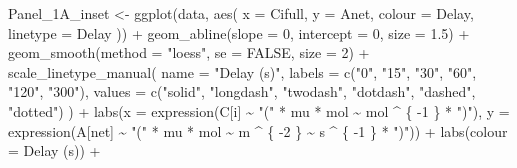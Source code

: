 \documentclass[
]{krantz}
\makeatletter
\newenvironment{Shaded}{\begin{snugshade}}{\end{snugshade}}
\newcommand{\AttributeTok}[1]{\textcolor[rgb]{0.77,0.63,0.00}{#1}}
\newcommand{\ConstantTok}[1]{\textcolor[rgb]{0.00,0.00,0.00}{#1}}
\newcommand{\DecValTok}[1]{\textcolor[rgb]{0.00,0.00,0.81}{#1}}
\newcommand{\FloatTok}[1]{\textcolor[rgb]{0.00,0.00,0.81}{#1}}
\newcommand{\FunctionTok}[1]{\textcolor[rgb]{0.00,0.00,0.00}{#1}}
\newcommand{\NormalTok}[1]{#1}
\newcommand{\OtherTok}[1]{\textcolor[rgb]{0.56,0.35,0.01}{#1}}
\newcommand{\SpecialCharTok}[1]{\textcolor[rgb]{0.00,0.00,0.00}{#1}}
\newcommand{\StringTok}[1]{\textcolor[rgb]{0.31,0.60,0.02}{#1}}
\newenvironment{kframe}{%
\medskip{}
\setlength{\fboxsep}{.8em}
 \def\at@end@of@kframe{}%
 \ifinner\ifhmode%
  \def\at@end@of@kframe{\end{minipage}}%
  \begin{minipage}{\columnwidth}%
 \fi\fi%
 \def\FrameCommand##1{\hskip\@totalleftmargin \hskip-\fboxsep
 \colorbox{shadecolor}{##1}\hskip-\fboxsep
     \hskip-\linewidth \hskip-\@totalleftmargin \hskip\columnwidth}%
 \MakeFramed {\advance\hsize-\width
   \@totalleftmargin\z@ \linewidth\hsize
   \@setminipage}}%
 {\par\unskip\endMakeFramed%
 \at@end@of@kframe}
\renewenvironment{Shaded}{\begin{kframe}}{\end{kframe}}
\makeatother
\begin{document}
\begin{Shaded}
\begin{Highlighting}[]
\NormalTok{Panel\_1A\_inset }\OtherTok{\textless{}{-}}
  \FunctionTok{ggplot}\NormalTok{(data, }\FunctionTok{aes}\NormalTok{(}
    \AttributeTok{x =}\NormalTok{ Cifull,}
    \AttributeTok{y =}\NormalTok{ Anet,}
    \AttributeTok{colour =}\NormalTok{ Delay,}
    \AttributeTok{linetype =}\NormalTok{ Delay}
\NormalTok{  )) }\SpecialCharTok{+}
  \FunctionTok{geom\_abline}\NormalTok{(}\AttributeTok{slope =} \DecValTok{0}\NormalTok{,}
              \AttributeTok{intercept =} \DecValTok{0}\NormalTok{,}
              \AttributeTok{size =} \FloatTok{1.5}\NormalTok{) }\SpecialCharTok{+}
  \FunctionTok{geom\_smooth}\NormalTok{(}\AttributeTok{method =} \StringTok{"loess"}\NormalTok{, }\AttributeTok{se =} \ConstantTok{FALSE}\NormalTok{, }\AttributeTok{size =} \DecValTok{2}\NormalTok{) }\SpecialCharTok{+}
  \FunctionTok{scale\_linetype\_manual}\NormalTok{(}
    \AttributeTok{name =} \StringTok{"Delay (s)"}\NormalTok{,}
    \AttributeTok{labels =} \FunctionTok{c}\NormalTok{(}\StringTok{"0"}\NormalTok{, }\StringTok{"15"}\NormalTok{, }\StringTok{"30"}\NormalTok{, }\StringTok{"60"}\NormalTok{, }\StringTok{"120"}\NormalTok{, }\StringTok{"300"}\NormalTok{),}
    \AttributeTok{values =} \FunctionTok{c}\NormalTok{(}\StringTok{"solid"}\NormalTok{, }\StringTok{"longdash"}\NormalTok{, }\StringTok{"twodash"}\NormalTok{, }\StringTok{"dotdash"}\NormalTok{, }\StringTok{"dashed"}\NormalTok{, }\StringTok{"dotted"}\NormalTok{)}
\NormalTok{  ) }\SpecialCharTok{+}
  \FunctionTok{labs}\NormalTok{(}\AttributeTok{x =} \FunctionTok{expression}\NormalTok{(C[i] }\SpecialCharTok{\textasciitilde{}} \StringTok{"("} \SpecialCharTok{*}\NormalTok{ mu }\SpecialCharTok{*}\NormalTok{ mol }\SpecialCharTok{\textasciitilde{}}\NormalTok{ mol }\SpecialCharTok{\^{}}\NormalTok{ \{}
    \SpecialCharTok{{-}}\DecValTok{1}
\NormalTok{  \} }\SpecialCharTok{*} \StringTok{")"}\NormalTok{),}
  \AttributeTok{y =} \FunctionTok{expression}\NormalTok{(A[net] }\SpecialCharTok{\textasciitilde{}} \StringTok{"("} \SpecialCharTok{*}\NormalTok{ mu }\SpecialCharTok{*}\NormalTok{ mol }\SpecialCharTok{\textasciitilde{}}\NormalTok{ m }\SpecialCharTok{\^{}}\NormalTok{ \{}
    \SpecialCharTok{{-}}\DecValTok{2}
\NormalTok{  \} }\SpecialCharTok{\textasciitilde{}}\NormalTok{ s }\SpecialCharTok{\^{}}\NormalTok{ \{}
    \SpecialCharTok{{-}}\DecValTok{1}
\NormalTok{  \} }\SpecialCharTok{*} \StringTok{")"}\NormalTok{)) }\SpecialCharTok{+}
  \FunctionTok{labs}\NormalTok{(}\AttributeTok{colour =} \StringTok{\textquotesingle{}Delay (s)\textquotesingle{}}\NormalTok{) }\SpecialCharTok{+}

\end{Highlighting}
\end{Shaded}
\end{document}
